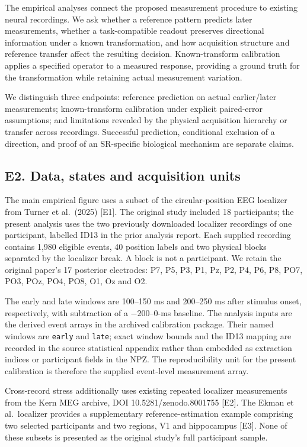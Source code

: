 \documentclass[11pt,a4paper]{article}
\begin{document}
The empirical analyses connect the proposed measurement procedure to
existing neural recordings. We ask whether a reference pattern predicts
later measurements, whether a task-compatible readout preserves
directional information under a known transformation, and how
acquisition structure and reference transfer affect the resulting
decision. Known-transform calibration applies a specified operator to a
measured response, providing a ground truth for the transformation while
retaining actual measurement variation.

We distinguish three endpoints: reference prediction on actual
earlier/later measurements; known-transform calibration under explicit
paired-error assumptions; and limitations revealed by the physical
acquisition hierarchy or transfer across recordings. Successful
prediction, conditional exclusion of a direction, and proof of an
SR-specific biological mechanism are separate claims.

\subsection{E2. Data, states and acquisition
units}\label{e2.-data-states-and-acquisition-units}

The main empirical figure uses a subset of the circular-position EEG
localizer from Turner et al.~(2025) {[}E1{]}. The original study
included 18 participants; the present analysis uses the two previously
downloaded localizer recordings of one participant, labelled ID13 in the
prior analysis report. Each supplied recording contains 1,980 eligible
events, 40 position labels and two physical blocks separated by the
localizer break. A block is not a participant. We retain the original
paper's 17 posterior electrodes: P7, P5, P3, P1, Pz, P2, P4, P6, P8,
PO7, PO3, POz, PO4, PO8, O1, Oz and O2.

The early and late windows are 100–150 ms and 200–250 ms after
stimulus onset, respectively, with subtraction of a \(-200\)–0-ms
baseline. The analysis inputs are the derived event arrays in the
archived calibration package. Their named windows are \texttt{early} and
\texttt{late}; exact window bounds and the ID13 mapping are recorded in
the source statistical appendix rather than embedded as extraction
indices or participant fields in the NPZ. The reproducibility unit for
the present calibration is therefore the supplied event-level
measurement array.

Cross-record stress additionally uses existing repeated localizer
measurements from the Kern MEG archive, DOI 10.5281/zenodo.8001755
{[}E2{]}. The Ekman et al.~localizer provides a supplementary
reference-estimation example comprising two selected participants and
two regions, V1 and hippocampus {[}E3{]}. None of these subsets is
presented as the original study's full participant sample.
\end{document}
